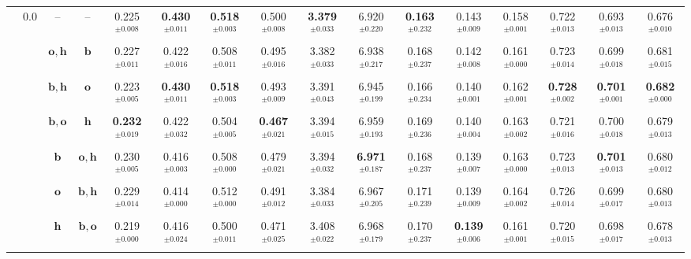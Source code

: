 \begin{table}
{\begin{tabular}{@{}cccccccccccccccc@{}}
        \multirow{7}{*}{\citep{bhatnagar22behave}} & \multirow{7}{*}{$0.0$} & -- & --
        & 0.225$^{\pm0.008}$ & \textbf{0.430$^{\pm0.011}$} & \textbf{0.518$^{\pm0.003}$} & 0.500$^{\pm0.008}$ & \textbf{3.379$^{\pm0.033}$} & 6.920$^{\pm0.220}$ & \textbf{0.163}$^{\pm0.232}$ & 0.143$^{\pm0.009}$ & 0.158$^{\pm0.001}$ & 0.722$^{\pm0.013}$ & 0.693$^{\pm0.013}$ & 0.676$^{\pm0.010}$ \\
        & & $\boldsymbol{o}, \boldsymbol{h}$ & $\boldsymbol{b}$
        & 0.227$^{\pm0.011}$ & 0.422$^{\pm0.016}$ & 0.508$^{\pm0.011}$ & 0.495$^{\pm0.016}$ & 3.382$^{\pm0.033}$ & 6.938$^{\pm0.217}$ & 0.168$^{\pm0.237}$ & 0.142$^{\pm0.008}$ & 0.161$^{\pm0.000}$ & 0.723$^{\pm0.014}$ & 0.699$^{\pm0.018}$ & 0.681$^{\pm0.015}$ \\
        & & $\boldsymbol{b}, \boldsymbol{h}$ & $\boldsymbol{o}$
        & 0.223$^{\pm0.005}$ & \textbf{0.430$^{\pm0.011}$} & \textbf{0.518$^{\pm0.003}$} & 0.493$^{\pm0.009}$ & 3.391$^{\pm0.043}$ & 6.945$^{\pm0.199}$ & 0.166$^{\pm0.234}$ & 0.140$^{\pm0.001}$ & 0.162$^{\pm0.001}$ & \textbf{0.728$^{\pm0.002}$} & \textbf{0.701$^{\pm0.001}$} & \textbf{0.682$^{\pm0.000}$}\\
        & & $\boldsymbol{b}, \boldsymbol{o}$ & $\boldsymbol{h}$
        & \textbf{0.232$^{\pm0.019}$} & 0.422$^{\pm0.032}$ & 0.504$^{\pm0.005}$ & \textbf{0.467$^{\pm0.021}$} & 3.394$^{\pm0.015}$ & 6.959$^{\pm0.193}$ & 0.169$^{\pm0.236}$ & 0.140$^{\pm0.004}$ & {0.163$^{\pm0.002}$} & 0.721$^{\pm0.016}$ & 0.700$^{\pm0.018}$ & 0.679$^{\pm0.013}$ \\
        & & $\boldsymbol{b}$ & $\boldsymbol{o}, \boldsymbol{h}$
        & 0.230$^{\pm0.005}$ & 0.416$^{\pm0.003}$ & 0.508$^{\pm0.000}$ & 0.479$^{\pm0.021}$ & 3.394$^{\pm0.032}$ & \textbf{6.971$^{\pm0.187}$} & 0.168$^{\pm0.237}$ & 0.139$^{\pm0.007}$ & {0.163$^{\pm0.000}$} & 0.723$^{\pm0.013}$ & \textbf{0.701$^{\pm0.013}$} & 0.680$^{\pm0.012}$ \\
        & & $\boldsymbol{o}$ & $\boldsymbol{b}, \boldsymbol{h}$
        & 0.229$^{\pm0.014}$ & 0.414$^{\pm0.000}$ & 0.512$^{\pm0.000}$ & 0.491$^{\pm0.012}$ & 3.384$^{\pm0.033}$ & 6.967$^{\pm0.205}$ & 0.171$^{\pm0.239}$ & 0.139$^{\pm0.009}$ & 0.164$^{\pm0.002}$ & 0.726$^{\pm0.014}$ & 0.699$^{\pm0.017}$ & 0.680$^{\pm0.013}$ \\
        & & $\boldsymbol{h}$ & $\boldsymbol{b}, \boldsymbol{o}$
        & 0.219$^{\pm0.000}$ & 0.416$^{\pm0.024}$ & 0.500$^{\pm0.011}$ & 0.471$^{\pm0.025}$ & 3.408$^{\pm0.022}$ & 6.968$^{\pm0.179}$ & 0.170$^{\pm0.237}$ & \textbf{0.139$^{\pm0.006}$} & 0.161$^{\pm0.001}$ & 0.720$^{\pm0.015}$ & 0.698$^{\pm0.017}$ & 0.678$^{\pm0.013}$ \\
        \midrule


\end{tabular}}
\end{table}
